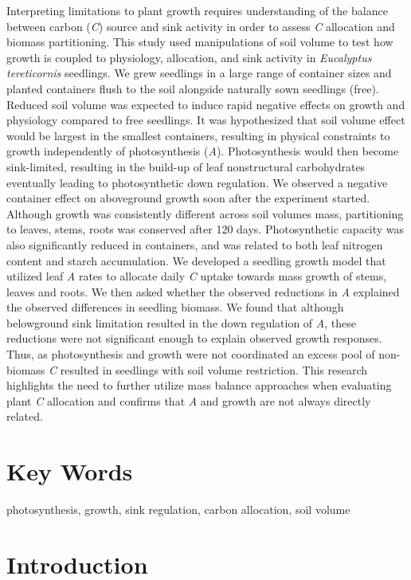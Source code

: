 \documentclass[a4paper]{article}\usepackage[]{graphicx}\usepackage[]{color}
\begin{document}
Interpreting limitations to plant growth requires understanding of the balance between carbon (\textit{C}) source and sink activity in order to assess \textit{C} allocation and biomass partitioning. This study used manipulations of soil volume to test how growth is coupled to physiology, allocation, and sink activity in \textit{Eucalyptus tereticornis} seedlings. We grew seedlings in a large range of container sizes and planted containers flush to the soil alongside naturally sown seedlings (free). Reduced soil volume was expected to induce rapid negative effects on growth and physiology compared to free seedlings. It was hypothesized that soil volume effect would be largest in the smallest containers, resulting in physical constraints to growth independently of photosynthesis (\textit{A}). Photosynthesis would then become sink-limited, resulting in the build-up of leaf nonstructural carbohydrates eventually leading to photosynthetic down regulation. We observed a negative container effect on aboveground growth soon after the experiment started. Although growth was consistently different across soil volumes mass, partitioning to leaves, stems, roots was conserved after 120 days. Photosynthetic capacity was also significantly reduced in containers, and was related to both leaf nitrogen content and starch accumulation. We developed a seedling growth model that utilized leaf \textit{A} rates to allocate daily \textit{C} uptake towards mass growth of stems, leaves and roots. We then asked whether the observed reductions in \textit{A} explained the observed differences in seedling biomass. We found that although belowground sink limitation resulted in the down regulation of \textit{A}, these reductions were not significant enough to explain observed growth responses. Thus, as photosynthesis and growth were not coordinated an excess pool of non-biomass \textit{C} resulted in seedlings with soil volume restriction. This research highlights the need to further utilize mass balance approaches when evaluating plant \textit{C} allocation and confirms that \textit{A} and growth are not always directly related.

\section*{Key Words}

photosynthesis, growth, sink regulation, carbon allocation, soil volume


\section*{Introduction}
\end{document}
